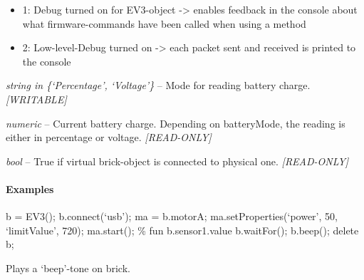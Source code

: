 \documentclass[letterpaper,10pt,english]{sphinxmanual}
\begin{document}
\begin{fulllineitems}
\begin{fulllineitems}
\begin{itemize}
\item {} 
1: Debug turned on for EV3-object -\textgreater{} enables feedback in the console about what firmware-commands have been called when using a method

\item {} 
2: Low-level-Debug turned on -\textgreater{} each packet sent and received is printed to the console

\end{itemize}

\end{fulllineitems}


\begin{fulllineitems}
\label{source:source.EV3.batteryMode}
\emph{string in \{`Percentage', `Voltage'\}} -- Mode for reading battery charge.
\emph{{[}WRITABLE{]}}

\end{fulllineitems}


\begin{fulllineitems}
\label{source:source.EV3.batteryValue}
\emph{numeric} -- Current battery charge. Depending on batteryMode, the reading
is either in percentage or voltage. \emph{{[}READ-ONLY{]}}

\end{fulllineitems}


\begin{fulllineitems}
\label{source:source.EV3.isConnected}
\emph{bool} -- True if virtual brick-object is connected to physical one. \emph{{[}READ-ONLY{]}}

\end{fulllineitems}

\paragraph{Examples}

b = EV3(); 
b.connect(`usb'); 
ma = b.motorA; 
ma.setProperties(`power', 50, `limitValue', 720); 
ma.start(); 
\% fun 
b.sensor1.value 
b.waitFor(); 
b.beep(); 
delete b; 

\begin{fulllineitems}
\label{source:source.EV3.beep}
Plays a `beep'-tone on brick.

\end{fulllineitems}
\end{fulllineitems}
\end{document}
